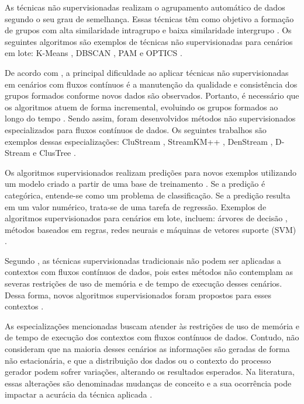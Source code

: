 \documentclass[qual, classic, a4paper]{ufbathesis}
\begin{document}
As técnicas não supervisionadas realizam o agrupamento automático de dados segundo o seu grau de semelhança.
Essas técnicas têm como objetivo a formação de grupos com alta similaridade intragrupo e baixa similaridade intergrupo \cite{Jain:1988:ACD:46712}.
Os seguintes algoritmos são exemplos de técnicas não supervisionadas para cenários em lote:
K-Means \cite{Lloyd:2006:LSQ:2263356.2269955},
DBSCAN \cite{Ester:1996:DAD:3001460.3001507},
PAM \cite{kaufman:clustering1990} e 
OPTICS \cite{Ankerst:1999:OOP:304181.304187}.

De acordo com , a principal dificuldade ao aplicar técnicas não supervisionadas em cenários com fluxos contínuos é a manutenção da qualidade e consistência dos grupos formados conforme novos dados são observados.
Portanto, é necessário que os algoritmos atuem de forma incremental, evoluindo os grupos formados ao longo do tempo \cite{Barbara:2002:RCD:507515.507519}.
Sendo assim, foram desenvolvidos métodos não supervisionados especializados para fluxos contínuos de dados.
Os seguintes trabalhos são exemplos dessas especializações:
CluStream \cite{Aggarwal:2003:FCE:1315451.1315460},
StreamKM++ \cite{Ackermann:2012:SCA:2133803.2184450},
DenStream \cite{Cao:Feng:Ester},
D-Stream \cite{Chen:Tu} e ClusTree \cite{Kranen:2011:CIM:2134350.2134352}.

Os algoritmos supervisionados realizam predições para novos exemplos utilizando um modelo criado a partir de uma base de treinamento \cite{Kotsiantis:2007:SML:1566770.1566773}.
Se a predição é categórica, entende-se como um problema de classificação.
Se a predição resulta em um valor numérico, trata-se de uma tarefa de regressão.
Exemplos de algoritmos supervisionados para cenários em lote, incluem:
árvores de decisão \cite{Breiman:Classification_Regression_Trees},
métodos baseados em regras, 
redes neurais e máquinas de vetores suporte (SVM) \cite{Vapnik1998}.

Segundo , 
as técnicas supervisionadas tradicionais não podem ser aplicadas a contextos com fluxos contínuos de dados, 
pois estes métodos não contemplam as severas restrições de uso de memória e de tempo de execução desses cenários.
%
Dessa forma, 
novos algoritmos supervisionados foram propostos para esses contextos \cite{Domingos:2000:MHD:347090.347107, Bifet:2013:EDS:2480362.2480516, Wang:2003:MCD:956750.956778, Aggarwal:2004:DCD:1014052.1014110, Gama:2003:ADT:956750.956813}.

As especializações mencionadas buscam atender às restrições de uso de memória e de tempo de execução dos contextos com fluxos contínuos de dados.
Contudo, não consideram que na maioria desses cenários as informações são geradas de forma não estacionária, e que a distribuição dos dados ou o contexto do processo gerador podem sofrer variações, alterando os resultados esperados.
Na literatura, essas alterações são denominadas mudanças de conceito e a sua ocorrência pode impactar a acurácia da técnica aplicada \cite{Gama:2010:KDD:1855075}.
\end{document}
